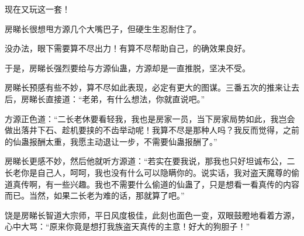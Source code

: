\begin{this_body}
现在又玩这一套！

房睇长很想甩方源几个大嘴巴子，但硬生生忍耐住了。

没办法，眼下需要算不尽出力！有算不尽帮助自己，的确效果良好。

于是，房睇长强烈要给与方源仙蛊，方源却是一直推脱，坚决不受。

房睇长预感有些不妙，算不尽如此表现，必定有更大的图谋。三番五次的推来让去后，房睇长直接道：“老弟，有什么想法，你就直说吧。”

方源正色道：“二长老休要看轻我，我也是房家一员，当下房家局势如此，我岂会做出落井下石、趁机要挟的不齿举动呢！我算不尽是那种人吗？我反而觉得，之前的仙蛊报酬太重，我愿主动退让一步，不需要仙蛊报酬了。”

房睇长更感不妙，然后他就听方源道：“若实在要我说，那我也只好坦诚布公，二长老你是自己人，呵呵，我也没有什么可以隐瞒你的。说实话，我对盗天魔尊的偷道真传啊，有一些兴趣。我也不需要什么偷道的仙蛊了，只是想看一看真传的内容而已。当然，如果二长老为难的话，那就算了吧。”

饶是房睇长智道大宗师，平日风度极佳，此刻也面色一变，双眼鼓瞪地看着方源，心中大骂：“原来你竟是想打我族盗天真传的主意！好大的狗胆子！”

\end{this_body}

